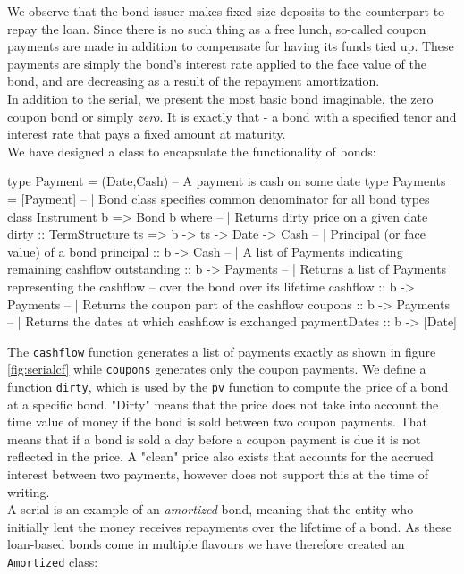 We observe that the bond issuer makes fixed size deposits to the counterpart to 
repay the loan. Since there is no such thing as a free lunch, so-called coupon 
payments are made in addition to compensate for having its funds tied up. These
payments are simply the bond's interest rate applied to the face value of the
bond, and are decreasing as a result of the repayment amortization\cite{hqldoc}.\\

In addition to the serial, we present the most basic bond imaginable, the zero 
coupon bond or simply \emph{zero}. It is exactly that - a bond with a specified 
tenor and interest rate that pays a fixed amount at maturity.\\

We have designed a class to encapsulate the functionality of bonds:

\begin{hscode}
type Payment = (Date,Cash) -- A payment is cash on some date
type Payments = [Payment]
-- | Bond class specifies common denominator for all bond types 
class Instrument b => Bond b where
  -- | Returns dirty price on a given date
  dirty :: TermStructure ts => b -> ts -> Date -> Cash
  -- | Principal (or face value) of a bond
  principal    :: b -> Cash
  -- | A list of Payments indicating remaining cashflow
  outstanding  :: b -> Payments
  -- | Returns a list of Payments representing the cashflow
  -- over the bond over its lifetime
  cashflow     :: b -> Payments
  -- | Returns the coupon part of the cashflow
  coupons      :: b -> Payments
  -- | Returns the dates at which cashflow is exchanged
  paymentDates :: b -> [Date]
\end{hscode}

The \texttt{cashflow} function generates a list of payments exactly as shown
in figure \ref{fig:serialcf} while \texttt{coupons} generates only the coupon
payments. We define a function \texttt{dirty}, which is used by the \texttt{pv}
function to compute the price of a bond at a specific bond. "Dirty" means that
the price does not take into account the time value of money if the bond is
sold between two coupon payments. That means that if a bond is sold a day before
a coupon payment is due it is not reflected in the price. A "clean" price also
exists that accounts for the accrued interest between two payments, however
\hql does not support this at the time of writing.\\

A serial is an example of an \emph{amortized} bond, meaning that the entity
who initially lent the money receives repayments over
the lifetime of a bond. As these loan-based bonds come in multiple flavours
we have therefore created an \texttt{Amortized} class:

